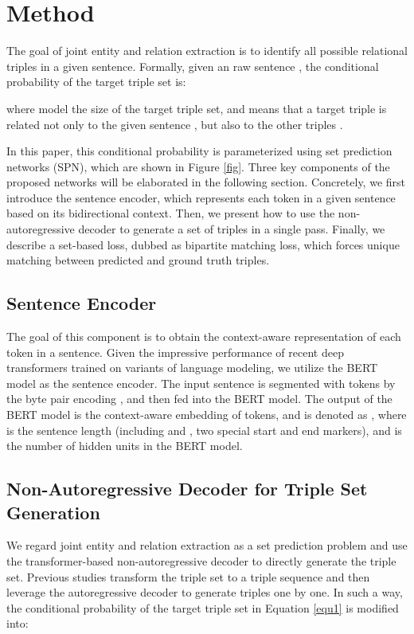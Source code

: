 \documentclass[letterpaper]{article} \usepackage{aaai21}  \usepackage{times}  \usepackage{helvet} \usepackage{courier}  \usepackage[hyphens]{url}  \usepackage{graphicx} \usepackage{amsfonts,amssymb}
\begin{document}
\section{Method}

The goal of joint entity and relation extraction is to identify all possible relational triples in a given sentence. Formally, given an raw sentence , the conditional probability of the target triple set  is: 

where  model the size of the target triple set, and  means that a target triple  is related not only to the given sentence , but also to the other triples .

In this paper, this conditional probability is parameterized using set prediction networks (SPN), which are shown in Figure \ref{fig}. Three key components of the proposed networks will be elaborated in the following section. Concretely, we first introduce the sentence encoder, which represents each token in a given sentence based on its bidirectional context. Then, we present how to use the non-autoregressive decoder to generate a set of triples in a single pass. Finally, we describe a set-based loss, dubbed as bipartite matching loss,  which forces unique matching between predicted and ground truth triples.





\subsection{Sentence Encoder}
\label{encoder}
The goal of this component is to obtain the context-aware representation of each token in a sentence. Given the impressive performance of recent deep transformers \cite{vaswani2017attention} trained on variants of language modeling, we utilize the BERT model \cite{devlin2018bert} as the sentence encoder.
The input sentence is segmented with tokens by the byte pair encoding \cite{sennrich-etal-2016-neural}, and then fed into the BERT model. The output of the BERT model is the context-aware embedding of tokens, and is denoted as , where  is the sentence length (including  and , two special start and end markers), and  is the number of hidden units in the BERT model.


\subsection{Non-Autoregressive Decoder for Triple Set Generation}
\label{decoder}
We regard joint entity and relation extraction as a set prediction problem and use the transformer-based non-autoregressive decoder \cite{gu2018non} to directly generate the triple set. Previous studies \cite{zeng2018extracting, zeng2019learning,nayak2019ptrnetdecoding,zeng2020copymtl} transform the triple set to a triple sequence and then leverage the autoregressive decoder to generate triples one by one. In such a way, the conditional probability of the target triple set in Equation \ref{equ1} is modified into:
\end{document}
